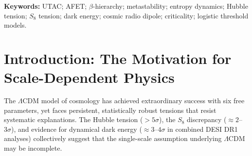 \documentclass[12pt,a4paper]{article}
\theoremstyle{definition}
\newcommand{\sigphi}{\sigma_{\Phi}}
\newcommand{\vrig}{v_{\mathrm{RIG}}}
\newcommand{\phigold}{\varphi}   %
\newcommand{\PhiAFET}{\Phi}      %
\begin{document}
\begin{abstract}
\noindent
We present the \textit{Allgemeine Feld-Entropie-Theorie} (AFET) together with its operative
mechanism, the \textit{Uncertainty-Threshold-Activation-Coupling} (UTAC) model, in their
current iterative state.
UTAC models non-linear regime transitions via the logistic equation
$dS/dt = \sigma(\beta(R-\Theta)) + \xi(t)$,
where $\beta$ is an empirically determined \emph{domain-specific} steepness parameter.
Statistical analysis across 78 threshold systems (ANOVA $F(4,73)=185.3$,
$p < 10^{-20}$, $\eta^2=0.91$) reveals that $\beta$ clusters into distinct
universality classes: informational $\approx 4.5$, biological $\approx 7.4$,
climate/BAO $\approx 11.0$, and neurodegeneration/early structure $\approx 13$.

AFET extends UTAC cosmologically through three universal constants:
the metastability buffer $\sigphi \approx 1/16$,
the integration velocity $\vrig \approx 1352\,\mathrm{km\,s^{-1}}$,
and the fractal scaling factor $\PhiAFET = \phigold^{1/3} \approx 1.174$.
We demonstrate that the Hubble tension, $S_8$ tension, and cosmic radio dipole anomaly
emerge naturally from scale-dependent $\beta$-transitions, and we provide
three falsifiable ``killer tests'' for the 2026--2027 observational window
(LIGO O5, Euclid DR1, DESI DR2).
An independently derived value of $\beta_{\mathrm{attractor}} \approx 13$
(Git commit \texttt{21ef03e}, 2026-01-21) was subsequently found to correspond
to the 13.5\,MHz electromagnetic resonance reported by Fontana et al.\ (2024)
in neural tissue; this temporal precedence is documented and constitutes
a potential cross-domain invariant warranting further investigation.
\end{abstract}

\medskip
\noindent\textbf{Keywords:}
UTAC; AFET; $\beta$-hierarchy; metastability; entropy dynamics; Hubble tension;
$S_8$ tension; dark energy; cosmic radio dipole; criticality; logistic threshold models.

\tableofcontents
\newpage

\section{Introduction: The Motivation for Scale-Dependent Physics}

The $\Lambda$CDM model of cosmology has achieved extraordinary success with six free
parameters, yet faces persistent, statistically robust tensions that resist systematic
explanations.
The Hubble tension ($>5\sigma$), the $S_8$ discrepancy ($\approx 2$--$3\sigma$),
and evidence for dynamical dark energy ($\approx 3$--$4\sigma$ in combined DESI DR1
analyses) collectively suggest that the single-scale assumption underlying
$\Lambda$CDM may be incomplete.
\end{document}
